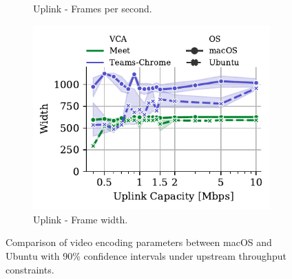 \begin{figure}[t]
\begin{subfigure}[t]{0.33\textwidth}
    \caption{Uplink - Frames per second.}
    \label{subfig:uplink_frames_per_second_mac}
    \end{subfigure}%
    \hfill
	\begin{subfigure}[t]{0.33\textwidth}   
        \centering
        \includegraphics[width=\textwidth]{figures/static_mac/uplink_sent_frameWidth_comparison.pdf}
    \caption{Uplink - Frame width.}
    \label{subfig:uplink_frame_width_mac}
    \end{subfigure}
	\caption{Comparison of video encoding parameters between macOS and Ubuntu with 90\% confidence intervals under upstream throughput constraints.}
    \vspace{-1em}
	\label{fig:video_qual_comparison}
\end{figure}

